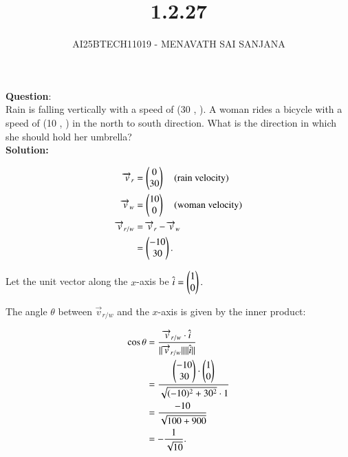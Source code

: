 \documentclass[journal]{IEEEtran}
\begin{document}

\vspace{3cm}

\title{1.2.27}
\author{AI25BTECH11019 - MENAVATH SAI SANJANA}
{\let\newpage\relax\maketitle}

\renewcommand{\thefigure}{\theenumi}
\renewcommand{\thetable}{\theenumi}
\setlength{\intextsep}{10pt} %


\renewcommand{\thetable}{\theenumi}

\textbf{Question}:\\
  Rain is falling vertically with a speed of (30 , ). A woman rides a bicycle with a speed of (10 , ) in the north to south direction. What is the direction in which she should hold her umbrella?
\\
\bigskip
\textbf{Solution: }

\begin{align}
\overrightarrow{v}_r &= \begin{pmatrix}0\\30\end{pmatrix} \quad \text{(rain velocity)} \\
\overrightarrow{v}_w &= \begin{pmatrix}10\\0\end{pmatrix} \quad \text{(woman velocity)} \\
\overrightarrow{v}_{r/w} &= \overrightarrow{v}_r - \overrightarrow{v}_w \\
&= \begin{pmatrix}-10\\30\end{pmatrix}.
\end{align}

Let the unit vector along the $x$-axis be 
$
\hat{i} = \begin{pmatrix}1 \\ 0\end{pmatrix}.
$

The angle $\theta$ between $\vec{v}_{r/w}$ and the $x$-axis is given by the inner product:

\begin{align}
\cos\theta &= \frac{\overrightarrow{v}_{r/w} \cdot \hat{i}}{\|\overrightarrow{v}_{r/w}\| \|\hat{i}\|} \\
&= \frac{\begin{pmatrix}-10\\30\end{pmatrix}\cdot \begin{pmatrix}1\\0\end{pmatrix}}{\sqrt{(-10)^2+30^2}\cdot 1} \\
&= \frac{-10}{\sqrt{100+900}} \\
&= -\frac{1}{\sqrt{10}}.
\end{align}
\end{document}
